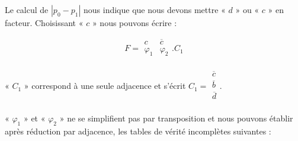 Le calcul de $| p_0 - p_1|$ nous indique que nous devons mettre « $d$ » ou « $c$ » en facteur. Choisissant « $c$ » nous pouvons écrire : 



\[ F =
\begin{array}{|c|c|}  c & \overline{c} \\ \varphi_1 &   \varphi_2 \\     \end{array} . C_1 
\]



« $C_1$ » correspond à une seule adjacence et s'écrit $ C_1 =  \begin{array}{|c|} \overline{c} \\ \overline{b} \\ \overline{d} \\ \end{array}$.



« $\varphi_1$ » et « $\varphi_2$ » ne se simplifient pas par transposition et nous pouvons établir après réduction par adjacence, les tables de vérité incomplètes suivantes : 




                                  
                                  
